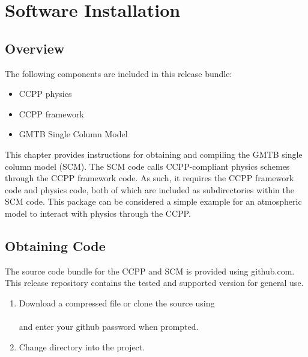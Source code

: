 \chapter{Software Installation}
\label{chapter: softwareinstall}
\setlength{\parskip}{12pt}
\label{section: softwareinstall}


\section{Overview}
The following components are included in this release bundle:

\begin{itemize}
	\item CCPP physics
	\item CCPP framework
	\item GMTB Single Column Model
\end{itemize}


This chapter provides instructions for obtaining and compiling 
the GMTB single column model (SCM). The SCM code calls CCPP-compliant
physics schemes through the CCPP framework code. As such, it requires the
CCPP framework code and physics code, both of which are included as 
subdirectories within the SCM code. This package can be considered a simple example
for an atmospheric model to interact with physics through the CCPP.

\section{Obtaining Code}

The source code bundle for the CCPP and SCM is provided using github.com.  This release repository contains the tested and supported version for general use.  

\begin{enumerate}

	\item Download a compressed file or clone the source using\\

	\\

	and enter your github password when prompted.\\

	\item Change directory into the project.\\


\end{enumerate}

